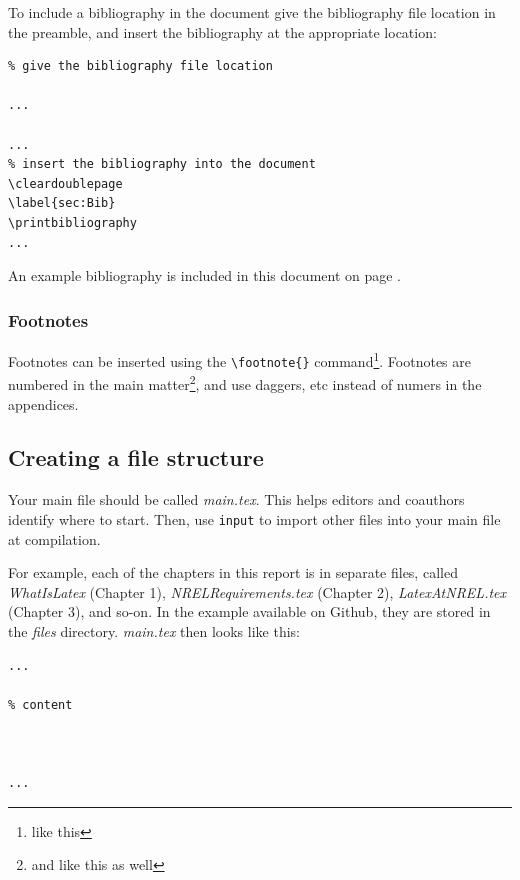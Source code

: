 To include a bibliography in the document give the bibliography file location in the preamble, and insert the bibliography at the appropriate location:

\begin{lstlisting}
% give the bibliography file location

...

...
% insert the bibliography into the document
\cleardoublepage
\label{sec:Bib}
\printbibliography
...

\end{lstlisting}

An example bibliography is included in this document on page \pageref{sec:Bib}.

\subsubsection{Footnotes}
Footnotes can be inserted using the \verb+\footnote{}+ command\footnote{like this}. Footnotes are numbered in the main matter\footnote{and like this as well}, and use daggers, etc instead of numers in the appendices.

\subsection{Creating a file structure}
\label{sec:FileStructure}
Your main file should be called \emph{main.tex}. This helps editors and coauthors identify where to start. Then, use \texttt{input} to import other files into your main file at compilation.

For example, each of the chapters in this report is in separate files, called \emph{WhatIsLatex} (Chapter 1), \emph{NRELRequirements.tex} (Chapter 2), \emph{LatexAtNREL.tex} (Chapter 3), and so-on. In the example available on Github, they are stored in the \emph{files} directory. \emph{main.tex} then looks like this:

\begin{lstlisting}
...

% content



...
\end{lstlisting}

